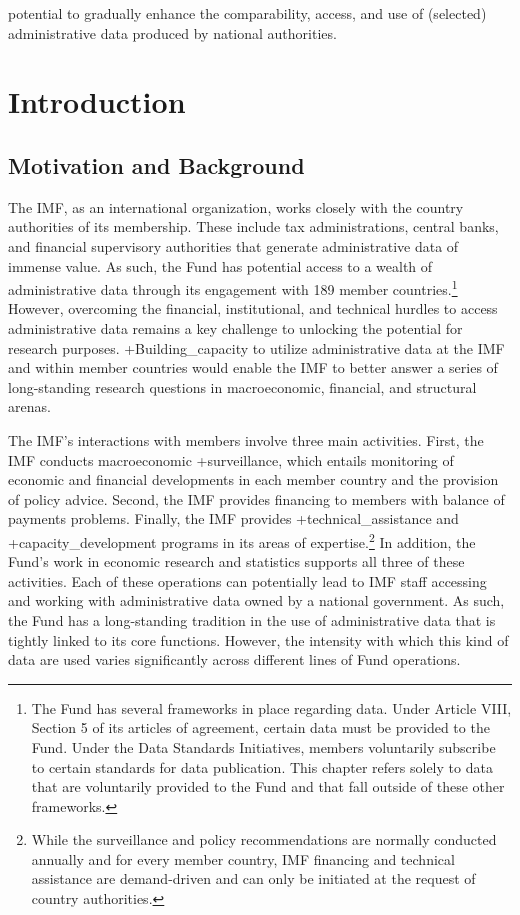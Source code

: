 \documentclass[
]{book}
\begin{document}
potential to gradually enhance the comparability, access, and use of (selected) administrative data produced by national authorities.

\hypertarget{introduction-9}{%
\section{Introduction}\label{introduction-9}}

\hypertarget{motivation-and-background-8}{%
\subsection{Motivation and Background}\label{motivation-and-background-8}}

The IMF, as an international organization, works closely with the country authorities of its membership. These include tax administrations, central banks, and financial supervisory authorities that generate administrative data of immense value. As such, the Fund has potential access to a wealth of administrative data through its engagement with 189 member countries.\footnote{The Fund has several frameworks in place regarding data. Under Article VIII, Section 5 of its articles of agreement, certain data must be provided to the Fund. Under the Data Standards Initiatives, members voluntarily subscribe to certain standards for data publication. This chapter refers solely to data that are voluntarily provided to the Fund and that fall outside of these other frameworks.} However, overcoming the financial, institutional, and technical hurdles to access administrative data remains a key challenge to unlocking the potential for research purposes. +Building\_capacity\textbar{} to utilize administrative data at the IMF and within member countries would enable the IMF to better answer a series of long-standing research questions in macroeconomic, financial, and structural arenas.

The IMF's interactions with members involve three main activities. First, the IMF conducts macroeconomic +surveillance\textbar, which entails monitoring of economic and financial developments in each member country and the provision of policy advice. Second, the IMF provides financing to members with balance of payments problems. Finally, the IMF provides +technical\_assistance\textbar{} and +capacity\_development\textbar{} programs in its areas of expertise.\footnote{While the surveillance and policy recommendations are normally conducted annually and for every member country, IMF financing and technical assistance are demand-driven and can only be initiated at the request of country authorities.} In addition, the Fund's work in economic research and statistics supports all three of these activities. Each of these operations can potentially lead to IMF staff accessing and working with administrative data owned by a national government. As such, the Fund has a long-standing tradition in the use of administrative data that is tightly linked to its core functions. However, the intensity with which this kind of data are used varies significantly across different lines of Fund operations.
\end{document}
